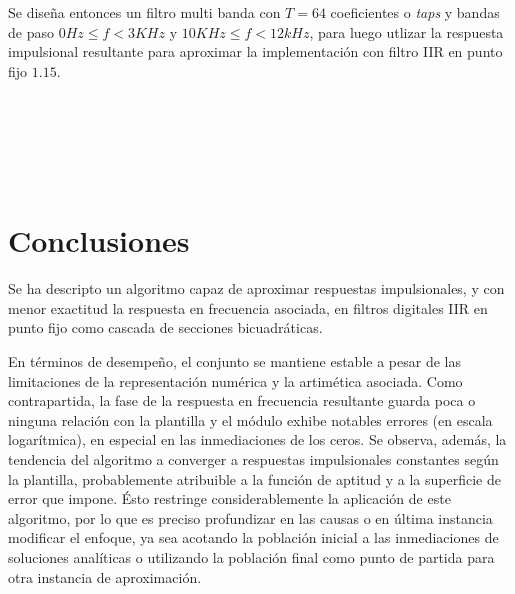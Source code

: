 \documentclass[11pt, journal]{IEEEtran}
\begin{document}
Se diseña entonces un filtro multi banda con \(T = 64\) coeficientes o
\emph{taps} y bandas de paso \(0 Hz \leq f < 3 KHz\) y
\(10 KHz \leq f < 12 kHz\), para luego utlizar la respuesta impulsional
resultante para aproximar la implementación con filtro IIR en punto fijo
\(1.15\).



    \begin{center}
    \end{center}
    { \hspace*{\fill} \\}
    

    \begin{center}
    \end{center}
    { \hspace*{\fill} \\}
    

    \begin{center}
    \end{center}
    { \hspace*{\fill} \\}
    
    \section{Conclusiones}

Se ha descripto un algoritmo capaz de aproximar respuestas
impulsionales, y con menor exactitud la respuesta en frecuencia
asociada, en filtros digitales IIR en punto fijo como cascada de
secciones bicuadráticas.

En términos de desempeño, el conjunto se mantiene estable a pesar de las
limitaciones de la representación numérica y la artimética asociada.
Como contrapartida, la fase de la respuesta en frecuencia resultante
guarda poca o ninguna relación con la plantilla y el módulo exhibe
notables errores (en escala logarítmica), en especial en las
inmediaciones de los ceros. Se observa, además, la tendencia del
algoritmo a converger a respuestas impulsionales constantes según la
plantilla, probablemente atribuible a la función de aptitud y a la
superficie de error que impone. Ésto restringe considerablemente la
aplicación de este algoritmo, por lo que es preciso profundizar en las
causas o en última instancia modificar el enfoque, ya sea acotando la
población inicial a las inmediaciones de soluciones analíticas o
utilizando la población final como punto de partida para otra instancia
de aproximación.
\end{document}
